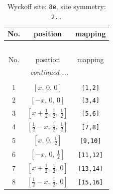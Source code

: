\documentclass[fleqn,8pt]{jsarticle}
\begin{document}
\renewcommand{\arraystretch}{1.2}
\begin{longtable}{ccc}
\caption{Wyckoff site: {\tt 8e}, site symmetry: {\tt 2..}}
 \\
 \hline \hline
No. & position & mapping \\ \hline \endfirsthead

\multicolumn{2}{l}{\tablename\ \thetable{}} \\
 \hline \hline
No. & position & mapping \\ \hline \endhead

 \hline \hline
\multicolumn{2}{r}{\footnotesize\it continued ...} \\ \endfoot

 \hline \hline
\multicolumn{2}{r}{} \\ \endlastfoot

1 & $\left[ x,\, 0,\, 0 \right]$ & {\tt [1,2]} \\ \hline
2 & $\left[ - x,\, 0,\, 0 \right]$ & {\tt [3,4]} \\ \hline
3 & $\left[ x + \frac{1}{2},\, \frac{1}{2},\, \frac{1}{2} \right]$ & {\tt [5,6]} \\ \hline
4 & $\left[ \frac{1}{2} - x,\, \frac{1}{2},\, \frac{1}{2} \right]$ & {\tt [7,8]} \\ \hline
5 & $\left[ x,\, 0,\, \frac{1}{2} \right]$ & {\tt [9,10]} \\ \hline
6 & $\left[ - x,\, 0,\, \frac{1}{2} \right]$ & {\tt [11,12]} \\ \hline
7 & $\left[ x + \frac{1}{2},\, \frac{1}{2},\, 0 \right]$ & {\tt [13,14]} \\ \hline
8 & $\left[ \frac{1}{2} - x,\, \frac{1}{2},\, 0 \right]$ & {\tt [15,16]} \\
\end{longtable}
\renewcommand{\arraystretch}{1.2}
\end{document}
